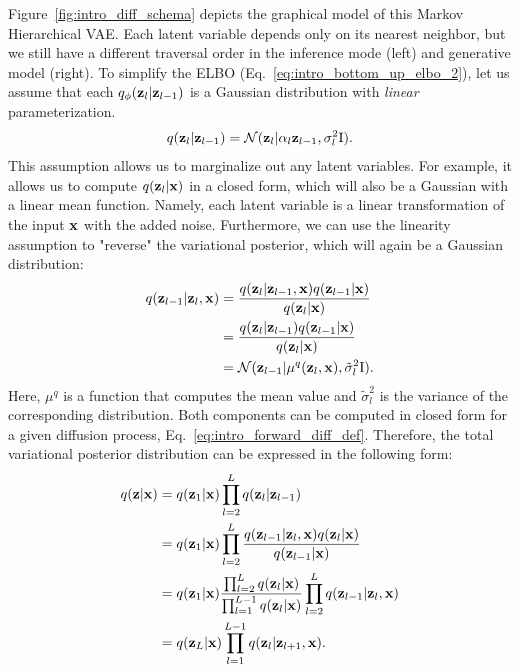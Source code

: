 Figure~\ref{fig:intro_diff_schema} depicts the graphical model of this Markov Hierarchical VAE. Each latent variable depends only on its nearest neighbor, but we still have a different traversal order in the inference mode (left) and generative model (right). To simplify the ELBO (Eq.~\ref{eq:intro_bottom_up_elbo_2}), let us assume that each $q_{\phi}({\mathbf{z}}_l|{\mathbf{z}}_{l-1})$ is a Gaussian distribution with \textit{linear} parameterization. 
\begin{equation}
\begin{aligned}\label{eq:intro_forward_diff_def}
    q(\rvz_l|\rvz_{l-1}) = \mathcal{N}(\rvz_l | \alpha_l \rvz_{l-1}, \sigma_l^2\text{I}).
\end{aligned}
\end{equation}
This assumption allows us to marginalize out any latent variables. For example, it allows us to compute $q({\mathbf{z}}_l|{\mathbf{x}})$ in a closed form, which will also be a Gaussian with a linear mean function. Namely, each latent variable is a linear transformation of the input ${\mathbf{x}}$ with the added noise.
 Furthermore, we can use the linearity assumption to "reverse" the variational posterior, which will again be a Gaussian distribution:
\begin{align}
q(\rvz_{l-1} |\rvz_l, \rvx) &= \frac{q(\rvz_l|\rvz_{l-1}, \rvx)q(\rvz_{l-1}|\rvx)}{q(\rvz_l|\rvx)}\\
&= \frac{q(\rvz_l|\rvz_{l-1})q(\rvz_{l-1}|\rvx)}{q(\rvz_l|\rvx)} \\
& = \mathcal{N}(\rvz_{l-1} | \mu^q(\rvz_l, \rvx), \tilde{\sigma}^2_l\text{I}).\label{eq:intro_diff_q_form}
\end{align}
Here, $\mu^q$ is a function that computes the mean value and $\tilde{\sigma}^2_l$ is the variance of the corresponding distribution. Both components can be computed in closed form for a given diffusion process, Eq.~\ref{eq:intro_forward_diff_def}. Therefore, the total variational posterior distribution can be expressed in the following form:
\begin{align}
    q({\mathbf{z}}|{\mathbf{x}}) &= q({\mathbf{z}}_1|{\mathbf{x}})\prod_{l=2}^L q({\mathbf{z}}_l|{\mathbf{z}}_{l-1}) \\
    & = q({\mathbf{z}}_1|{\mathbf{x}})\prod_{l=2}^L \frac{q({\mathbf{z}}_{l-1} |{\mathbf{z}}_l, {\mathbf{x}})q({\mathbf{z}}_l|{\mathbf{x}})}{q({\mathbf{z}}_{l-1}|{\mathbf{x}})}\\
    & = q({\mathbf{z}}_1|{\mathbf{x}})  \frac{\prod_{l=2}^L q({\mathbf{z}}_l|{\mathbf{x}})}{\prod_{l=1}^{L-1} q({\mathbf{z}}_{l}|{\mathbf{x}})}\prod_{l=2}^L q({\mathbf{z}}_{l-1} |{\mathbf{z}}_l, {\mathbf{x}})\\
    & = q({\mathbf{z}}_L|{\mathbf{x}})\prod_{l=1}^{L-1} q({\mathbf{z}}_{l} |{\mathbf{z}}_{l+1}, {\mathbf{x}}).
\end{align}
